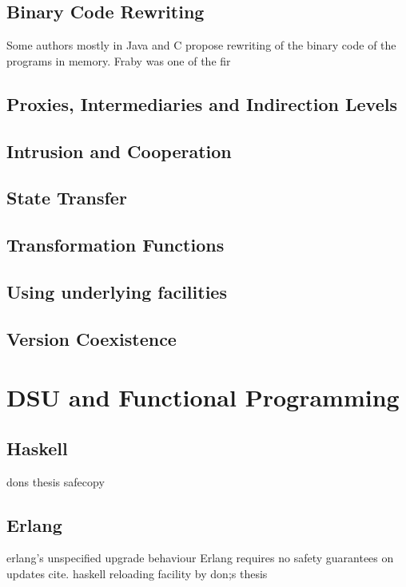 \subsection{Binary Code Rewriting}

Some authors mostly in Java and C propose rewriting of the binary code of the programs in memory. Fraby was one of the fir 
\subsection{Proxies, Intermediaries and Indirection Levels}

\subsection{Intrusion and Cooperation}

\subsection{State Transfer}

\subsection{Transformation Functions}

\subsection{Using underlying facilities}

\subsection{Version Coexistence}


\section{DSU and Functional Programming}

\subsection{Haskell}

dons thesis
safecopy

\subsection{Erlang}


erlang's unspecified upgrade behaviour
Erlang requires no safety guarantees on updates cite.
haskell reloading facility by don;s thesis
